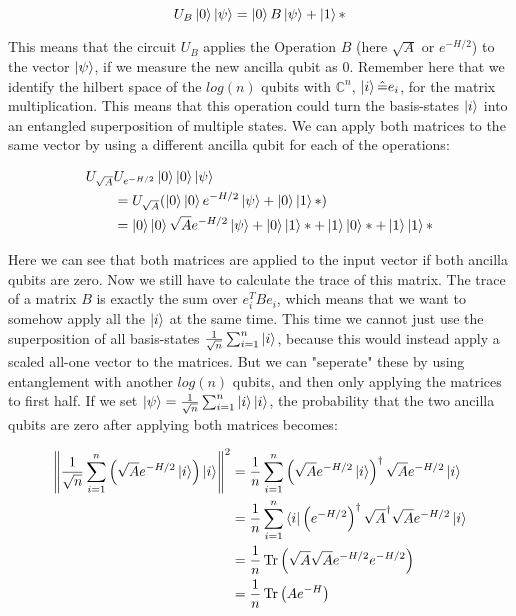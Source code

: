\documentclass[11pt,a4paper]{scrartcl}
\DeclareMathOperator{\Tr}{Tr}
\newcommand{\C}{\mathbb{C}}
\begin{document}
\begin{equation*}
U_B\ket{0}\ket{\psi}=\ket{0}B\ket{\psi}+\ket{1}*
\end{equation*}

This means that the circuit $U_B$ applies the Operation $B$ (here $\sqrt{A}$ or $e^{-H/2}$) to the vector $\ket{\psi}$, if we measure the new ancilla qubit as $0$. Remember here that we identify the hilbert space of the $log(n)$ qubits with $\C^n$, $\ket{i} \hat{=} e_i$, for the matrix multiplication. This means that this operation could turn the basis-states $\ket{i}$ into an entangled superposition of multiple states. We can apply both matrices to the same vector by using a different ancilla qubit for each of the operations:

\begin{align*}
U_{\sqrt{A}}&U_{e^{-H/2}}\ket{0}\ket{0}\ket{\psi}\\
&=U_{\sqrt{A}}(\ket{0}\ket{0}e^{-H/2}\ket{\psi}+\ket{0}\ket{1}*)\\
&=\ket{0}\ket{0}\sqrt{A}e^{-H/2}\ket{\psi}+\ket{0}\ket{1}*+\ket{1}\ket{0}*+\ket{1}\ket{1}*
\end{align*}

Here we can see that both matrices are applied to the input vector if both ancilla qubits are zero. Now we still have to calculate the trace of this matrix. The trace of a matrix $B$ is exactly the sum over $e_i^T Be_i$, which means that we want to somehow apply all the $\ket{i}$ at the same time. This time we cannot just use the superposition of all basis-states $\frac{1}{\sqrt n}\sum_{i=1}^n \ket{i}$, because this would instead apply a scaled all-one vector to the matrices. But we can "seperate" these by using entanglement with another $log(n)$ qubits, and then only applying the matrices to first half. If we set $\ket{\psi}=\frac{1}{\sqrt n}\sum_{i=1}^n \ket{i}\ket{i}$, the probability that the two ancilla qubits are zero after applying both matrices becomes:

\begin{align*}
\left\|\frac{1}{\sqrt n}\sum_{i=1}^n\left(\sqrt{A}e^{-H/2}\ket{i}\right)\ket{i}\right\|^2
&=\frac{1}{n}\sum_{i=1}^n \left(\sqrt{A}e^{-H/2}\ket{i}\right)^\dagger\sqrt{A}e^{-H/2}\ket{i}\\
&=\frac{1}{n}\sum_{i=1}^n \bra{i}\left(e^{-H/2}\right)^\dagger\sqrt{A}^\dagger\sqrt{A}e^{-H/2}\ket{i}\\
&=\frac{1}{n}\Tr\left(\sqrt{A}\sqrt{A}e^{-H/2}e^{-H/2}\right)\\
&=\frac{1}{n}\Tr\left(Ae^{-H}\right)
\end{align*}
\end{document}
